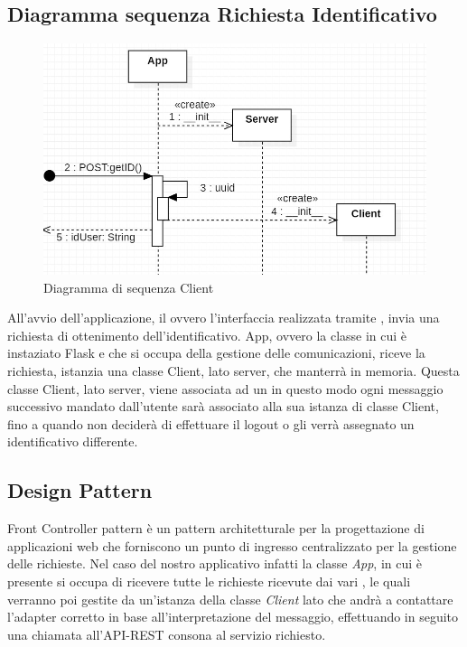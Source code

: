 \subsection{Diagramma sequenza Richiesta Identificativo}
\begin{figure}[H]
    \centering\includegraphics[width=\linewidth]{images/diagramma_sequenza_client.jpg}
    \caption{Diagramma di sequenza Client}
\end{figure}
All'avvio dell'applicazione, il  ovvero l'interfaccia realizzata tramite , invia una richiesta di ottenimento dell'identificativo. App, ovvero la classe in cui è instaziato Flask e che si occupa della gestione delle comunicazioni, riceve la richiesta, istanzia una classe Client, lato server, che manterrà in memoria. Questa classe Client, lato server, viene associata ad un  in questo modo ogni messaggio successivo mandato dall'utente sarà associato alla sua istanza di classe Client, fino a quando non deciderà di effettuare il logout o gli verrà assegnato un identificativo differente. 

\newpage

\subsection{Design Pattern}
Front Controller pattern è un pattern architetturale per la progettazione di applicazioni web che forniscono un punto di ingresso centralizzato per la gestione delle richieste. Nel caso del nostro applicativo infatti la classe \textit{App}, in cui è presente  si occupa di ricevere tutte le richieste ricevute dai vari , le quali verranno poi gestite da un'istanza della classe \textit{Client} lato  che andrà a contattare l'adapter corretto in base all'interpretazione del messaggio, effettuando in seguito una chiamata all'API-REST consona al servizio richiesto.
\newpage




